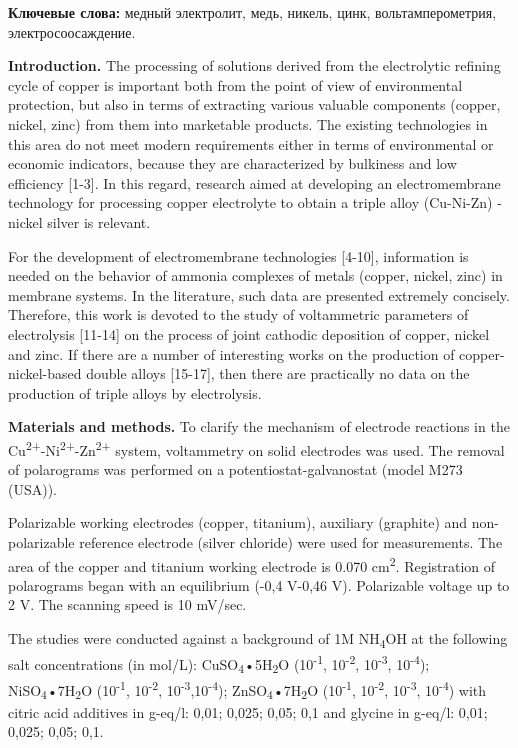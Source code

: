 {\bfseries Ключевые слова:} медный электролит, медь, никель, цинк,
вольтамперометрия, электросоосаждение.

\begin{multicols}{2}
{\bfseries Introduction.} The processing of solutions derived from the
electrolytic refining cycle of copper is important both from the point
of view of environmental protection, but also in terms of extracting
various valuable components (copper, nickel, zinc) from them into
marketable products. The existing technologies in this area do not meet
modern requirements either in terms of environmental or economic
indicators, because they are characterized by bulkiness and low
efficiency {[}1-3{]}. In this regard, research aimed at developing an
electromembrane technology for processing copper electrolyte to obtain a
triple alloy (Cu-Ni-Zn) - nickel silver is relevant.

For the development of electromembrane technologies {[}4-10{]},
information is needed on the behavior of ammonia complexes of metals
(copper, nickel, zinc) in membrane systems. In the literature, such data
are presented extremely concisely. Therefore, this work is devoted to
the study of voltammetric parameters of electrolysis {[}11-14{]} on the
process of joint cathodic deposition of copper, nickel and zinc. If
there are a number of interesting works on the production of
copper-nickel-based double alloys {[}15-17{]}, then there are
practically no data on the production of triple alloys by electrolysis.

{\bfseries Materials and methods.} To clarify the mechanism of electrode
reactions in the
Cu\textsuperscript{2+}-Ni\textsuperscript{2+}-Zn\textsuperscript{2+}
system, voltammetry on solid electrodes was used. The removal of
polarograms was performed on a potentiostat-galvanostat (model M273
(USA)).

Polarizable working electrodes (copper, titanium), auxiliary (graphite)
and non-polarizable reference electrode (silver chloride) were used for
measurements. The area of the copper and titanium working electrode is
0.070 cm\textsuperscript{2}. Registration of polarograms began with an
equilibrium (-0,4 V-0,46 V). Polarizable voltage up to 2 V. The scanning
speed is 10 mV/sec.

The studies were conducted against a background of 1M
NH\textsubscript{4}OH at the following salt concentrations (in mol/L):
CuSO\textsubscript{4}•5H\textsubscript{2}O (10\textsuperscript{-1},
10\textsuperscript{-2}, 10\textsuperscript{-3}, 10\textsuperscript{-4});
NiSO\textsubscript{4}•7H\textsubscript{2}O (10\textsuperscript{-1},
10\textsuperscript{-2}, 10\textsuperscript{-3},10\textsuperscript{-4});
ZnSO\textsubscript{4}•7H\textsubscript{2}O (10\textsuperscript{-1},
10\textsuperscript{-2}, 10\textsuperscript{-3}, 10\textsuperscript{-4})
with citric acid additives in g-eq/l: 0,01; 0,025; 0,05; 0,1 and glycine
in g-eq/l: 0,01; 0,025; 0,05; 0,1.


\end{multicols}
